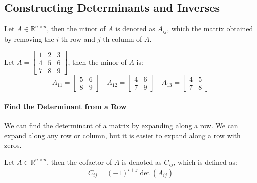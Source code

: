 \documentclass[11pt]{article}
\begin{document}
\subsection{Constructing Determinants and Inverses}
\begin{definition}
    Let $A \in \mathbb{R}^{n \times n}$, then the minor of $A$ is denoted as $A_{ij}$, which the matrix obtained by removing the $i$-th row and $j$-th column of $A$.
\end{definition}
\begin{example}
    Let $A = \begin{bmatrix} 1 & 2 & 3 \\ 4 & 5 & 6 \\ 7 & 8 & 9 \end{bmatrix}$, then the minor of $A$ is:
    $$ A_{11} = \begin{bmatrix} 5 & 6 \\ 8 & 9 \end{bmatrix} \quad A_{12} = \begin{bmatrix} 4 & 6 \\ 7 & 9 \end{bmatrix} \quad A_{13} = \begin{bmatrix} 4 & 5 \\ 7 & 8 \end{bmatrix} $$
\end{example}
\paragraph{Find the Determinant from a Row} We can find the determinant of a matrix by expanding along a row. We can expand along any row or column, but it is easier to expand along a row with zeros.
\begin{definition}[Cofactor]
    Let $A \in \mathbb{R}^{n \times n}$, then the cofactor of $A$ is denoted as $C_{ij}$, which is defined as:
    \begin{equation}
        C_{ij} = (-1)^{i+j}\det(A_{ij})
    \end{equation}
\end{definition}
\end{document}
